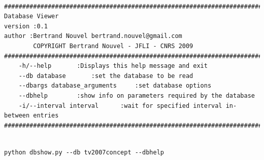 \documentclass{report}
\begin{document}
{\small  \tt
\begin{verbatim}
#######################################################################################
Database Viewer
version :0.1
author :Bertrand Nouvel bertrand.nouvel@gmail.com
        COPYRIGHT Bertrand Nouvel - JFLI - CNRS 2009
#######################################################################################
	-h/--help 		:Displays this help message and exit
	--db database		:set the database to be read
	--dbargs database_arguments		:set database options
	--dbhelp 		:show info on parameters required by the database
	-i/--interval interval		:wait for specified interval in-between entries
#######################################################################################


\end{verbatim}
}















\begin{lstlisting}
python dbshow.py --db tv2007concept --dbhelp

\end{lstlisting}
\end{document}
